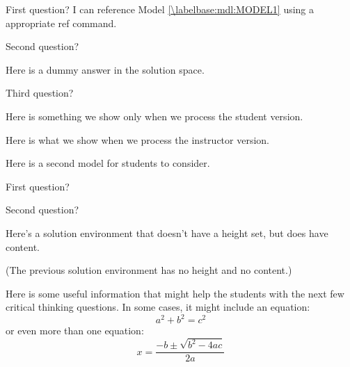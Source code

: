 \begin{activity}
\begin{ctqs}

	\question First question?  I can reference Model \ref{\labelbase:mdl:MODEL1} using a appropriate ref command.
	
		\begin{solution}[1in]{}
		\end{solution}
		
	\question Second question?
	
		\begin{solution}[1in]{}
			Here is a dummy answer in the solution space.
		\end{solution}
		
	\question Third question?
	
		\begin{solution}[1in]{Here is something we show only when we process the student version.}
			
			Here is what we show when we process the instructor version.
			
		\end{solution}

\end{ctqs}



\begin{model}[DEF]
\label{\labelbase:mdl:MODEL2}

	Here is a second model for students to consider.

\end{model}

\begin{ctqs}

	\question First question?
	
		\begin{solution}[1in]{}
		\end{solution}
	
	\question Second question?
	
		\begin{solution}{}
		
			Here's a solution environment that doesn't have a height set, but does have content.
			
			(The previous solution environment has no height and no content.)		
		
		\end{solution}
\end{ctqs}

		
\begin{infobox}
	Here is some useful information that might help the students with the next few critical thinking questions.
	In some cases, it might include an equation:
	\begin{equation*}
		a^2 + b^2 = c^2
	\end{equation*}
	or even more than one equation:
	\begin{equation*}
		x=\frac{-b \pm \sqrt{b^2-4ac}}{2a}
	\end{equation*}
\end{infobox}


\end{activity}

